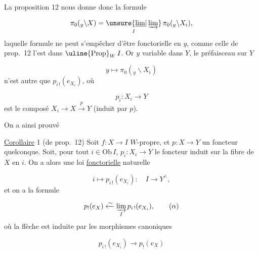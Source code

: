La proposition 12 nous donne donc la formule

\[
\pi_0({}_y\backslash X)=\underset{I}{\unsure{\underline{\lim}|\varinjlim}}\,\pi_0({}_y\backslash X_i),
\]
laquelle formule ne peut s'empêcher d'être fonctorielle en $y$,  comme celle de prop.~12  l'est dans $\text{\uline{Prop}}_W\,I$. Or  $y$ variable dans $Y$, le  préfaisceau sur $Y$

\[
y\longmapsto\pi_0({}_y\backslash X_i)
\]
n'est autre que $p_{i\,!}(e_{X_i})$, où

\[
p_i:X_i\longrightarrow Y
\]
est le composé $X_i\to X\xrightarrow{p}Y$ (induit par $p$).

On a ainsi prouvé

\uline{Corollaire} 1 (de prop.~12) Soit $f:X\to I$ $W$-propre,
 et $p:X\to Y$ un foncteur quelconque. Soit, pour tout $i\in\mathrm{Ob}\,I$, $p_i:X_i\to Y$ le foncteur induit sur la fibre  de $X$ en $i$. On a alors une loi \uline{fonctorielle} naturelle

\[
i\longmapsto p_{i\,!}(e_{X_i}):\quad I\longrightarrow Y^\wedge,
\]
et on a la formule

\[
p_!(e_X)\xleftarrow{\sim}\underset{I}{\varinjlim}\,p_{i\,!}(e_{X_i}),\tag*{($\alpha$)}
\]
où la flèche est induite par les morphismes canoniques

\[
p_{i\,!}(e_{X_i})\to p_!(e_X)
\]
